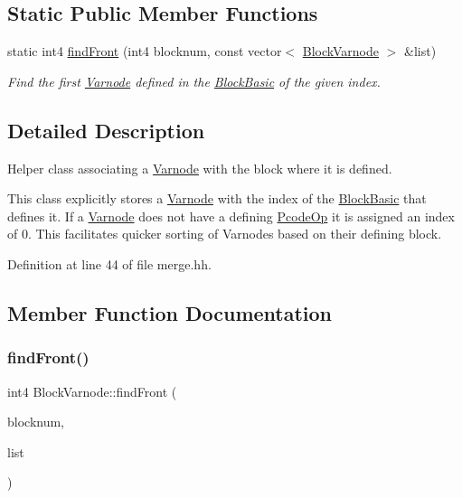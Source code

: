 \subsection*{Static Public Member Functions}
\begin{DoxyCompactItemize}
\item 
static int4 \mbox{\hyperlink{class_block_varnode_a944320adf17c44b207d095cca216ee63}{find\+Front}} (int4 blocknum, const vector$<$ \mbox{\hyperlink{class_block_varnode}{Block\+Varnode}} $>$ \&list)
\begin{DoxyCompactList}\small\item\em Find the first \mbox{\hyperlink{class_varnode}{Varnode}} defined in the \mbox{\hyperlink{class_block_basic}{Block\+Basic}} of the given index. \end{DoxyCompactList}\end{DoxyCompactItemize}


\subsection{Detailed Description}
Helper class associating a \mbox{\hyperlink{class_varnode}{Varnode}} with the block where it is defined. 

This class explicitly stores a \mbox{\hyperlink{class_varnode}{Varnode}} with the index of the \mbox{\hyperlink{class_block_basic}{Block\+Basic}} that defines it. If a \mbox{\hyperlink{class_varnode}{Varnode}} does not have a defining \mbox{\hyperlink{class_pcode_op}{Pcode\+Op}} it is assigned an index of 0. This facilitates quicker sorting of Varnodes based on their defining block. 

Definition at line 44 of file merge.\+hh.



\subsection{Member Function Documentation}
\mbox{\label{class_block_varnode_a944320adf17c44b207d095cca216ee63}} 
\subsubsection{\texorpdfstring{findFront()}{findFront()}}
{\footnotesize\ttfamily int4 Block\+Varnode\+::find\+Front (\begin{DoxyParamCaption}\item[{int4}]{blocknum,  }\item[{const vector$<$ \mbox{\hyperlink{class_block_varnode}{Block\+Varnode}} $>$ \&}]{list }\end{DoxyParamCaption})\hspace{0.3cm}{\ttfamily [static]}}



